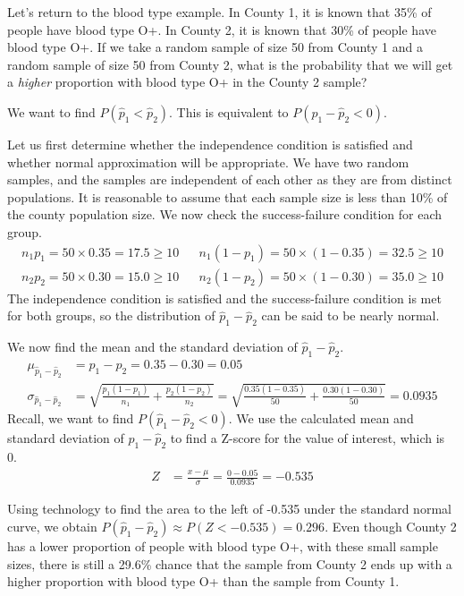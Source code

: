 \begin{examplewrap}
\begin{nexample}{
  Let's return to the blood type example.
  In County 1, it is known that 35\% of people have blood type O+.  In County 2, it is known that 30\% of people have blood type O+.  If we take a random sample of size 50 from County 1 and a random sample of size 50 from County 2, what is the probability that we will get a \emph{higher} proportion with blood type O+ in the County 2 sample?}

We want to find $P(\hat{p}_1<\hat{p}_2)$.  This is equivalent to $P(\hat{p}_1-\hat{p}_2<0)$. 

Let us first determine whether the independence condition is satisfied and whether normal approximation will be appropriate.  We have two random samples, and the samples are independent of each other as they are from distinct populations.  It is reasonable to assume that each sample size is less than 10\% of the county population size.  We now check the success-failure condition for each group.   
\begin{align*}
n_1 p_1 = 50 \times 0.35 = 17.5\ge 10 &&
    n_1 (1 - p_1) = 50 \times (1-0.35) = 32.5\ge 10\\
n_2 p_2 = 50 \times 0.30 = 15.0\ge 10 &&
    n_2 (1 - p_2) = 50 \times (1-0.30) = 35.0\ge 10
\end{align*}
The independence condition is satisfied and the success-failure condition is met for both groups, so the distribution of $\hat{p}_1-\hat{p}_2$ can be said to be nearly normal.  

We now find the mean and the standard deviation of $\hat{p}_1-\hat{p}_2$.  
\begin{align*}
\mu_{\hat{p}_1-\hat{p}_2} &= p_1-p_2 = 0.35 - 0.30 = 0.05 \\
\sigma_{\hat{p}_1-\hat{p}_2}
  &= \sqrt{\frac{p_1(1-p_1)}{n_1} + \frac{p_2(1-p_2)}{n_2}}
  =\sqrt{\frac{0.35(1-0.35)}{50} + \frac{0.30(1-0.30)}{50}}
  = 0.0935
\end{align*}
Recall, we want to find $P(\hat{p}_1-\hat{p}_2<0)$.  We use the calculated mean and standard deviation of $\hat{p}_1-\hat{p}_2$ to find a Z-score for the value of interest, which is 0.
\begin{align*}
Z &= \frac{x - \mu}{\sigma} = \frac{0 - 0.05}{0.0935}=-0.535
\end{align*}

Using technology to find the area to the left of -0.535 under the standard normal curve, we obtain $P(\hat{p}_1-\hat{p}_2) \approx P(Z < -0.535) = 0.296$.  Even though County 2 has a lower proportion of people with blood type O+, with these small sample sizes, there is still a 29.6\% chance that the sample from County 2 ends up with a higher proportion with blood type O+  than the sample from County 1.
\end{nexample}
\end{examplewrap}


